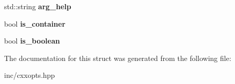\begin{DoxyCompactItemize}
\item 
std\+::string {\bfseries arg\+\_\+help}\hypertarget{structcxxopts_1_1HelpOptionDetails_a61afda425e73f688a21eae557efa8f25}{}\label{structcxxopts_1_1HelpOptionDetails_a61afda425e73f688a21eae557efa8f25}

\item 
bool {\bfseries is\+\_\+container}\hypertarget{structcxxopts_1_1HelpOptionDetails_a68e51f91246958b2e3e84d0178a55afe}{}\label{structcxxopts_1_1HelpOptionDetails_a68e51f91246958b2e3e84d0178a55afe}

\item 
bool {\bfseries is\+\_\+boolean}\hypertarget{structcxxopts_1_1HelpOptionDetails_ae9edda8b102865694f3b76ef162f0ead}{}\label{structcxxopts_1_1HelpOptionDetails_ae9edda8b102865694f3b76ef162f0ead}

\end{DoxyCompactItemize}


The documentation for this struct was generated from the following file\+:\begin{DoxyCompactItemize}
\item 
inc/cxxopts.\+hpp\end{DoxyCompactItemize}
